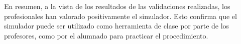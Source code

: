 \clearpage




En resumen, a la vista de los resultados de las validaciones realizadas, los profesionales han valorado positivamente el simulador. Esto confirma que el simulador puede ser utilizado como herramienta de clase por parte de los profesores, como por el alumnado para practicar el procedimiento. 
